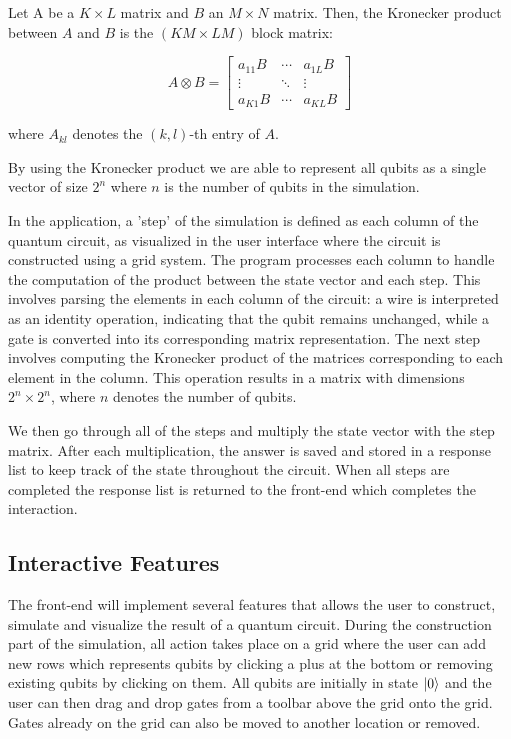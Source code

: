  Let A be a $K \times L$ matrix and $B$ an $M \times N$ matrix. Then, the Kronecker product between $A$ and $B$ is the $(KM \times LM)$ block matrix:

 \[
A \otimes B = \begin{bmatrix}
a_{11}B & \cdots & a_{1L}B \\
\vdots & \ddots & \vdots \\
a_{K1}B & \cdots & a_{KL}B
\end{bmatrix}
\]

where $A_{kl}$ denotes the $(k,l) $-th entry of $A$. 

By using the Kronecker product we are able to represent all qubits as a single vector of size $2^n$ where $n$ is the number of qubits in the simulation. 

In the application, a 'step' of the simulation is defined as each column of the quantum circuit, as visualized in the user interface where the circuit is constructed using a grid system. The program processes each column to handle the computation of the product between the state vector and each step. This involves parsing the elements in each column of the circuit: a wire is interpreted as an identity operation, indicating that the qubit remains unchanged, while a gate is converted into its corresponding matrix representation. The next step involves computing the Kronecker product of the matrices corresponding to each element in the column. This operation results in a matrix with dimensions $2^n \times 2^n$, where $n$ denotes the number of qubits.

We then go through all of the steps and multiply the state vector with the step matrix. After each multiplication, the answer is saved and stored in a response list to keep track of the state throughout the circuit. When all steps are completed the response list is returned to the front-end which completes the interaction.

\subsection{Interactive Features}
The front-end will implement several features that allows the user to construct, simulate and visualize the result of a quantum circuit. During the construction part of the simulation, all action takes place on a grid where the user can add new rows which represents qubits by clicking a plus at the bottom or removing existing qubits by clicking on them. All qubits are initially in state $\ket{0}$ and the user can then drag and drop gates from a toolbar above the grid onto the grid. Gates already on the grid can also be moved to another location or removed. 

